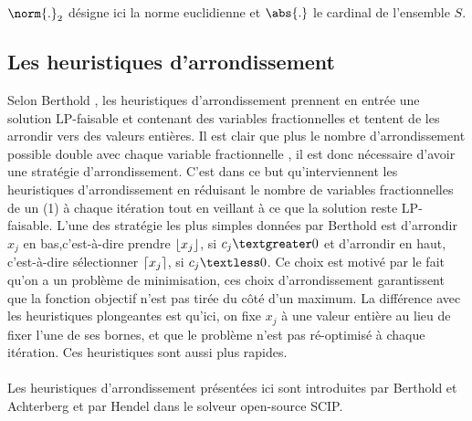 \documentclass[12pt,a4paper,oneside]{book}
\theoremstyle{definition}
\DeclarePairedDelimiter\ceil{\lceil}{\rceil}
\DeclarePairedDelimiter\floor{\lfloor}{\rfloor}
\begin{document}
	$\norm{.}_2$ désigne ici la norme euclidienne et $\abs{.}$ le cardinal de l'ensemble $S$.
	
	
	\paragraph{}
	
	\subsection{Les heuristiques d'arrondissement}
	Selon Berthold \cite{Bertholda}, les heuristiques d'arrondissement prennent en entrée une solution LP-faisable et contenant des variables fractionnelles et tentent de les arrondir vers des valeurs entières. Il est clair que plus le nombre d'arrondissement possible double avec chaque variable fractionnelle \cite{berthold2006}, il est donc nécessaire d'avoir une stratégie d'arrondissement. C'est dans ce but qu'interviennent les heuristiques d'arrondissement en réduisant le nombre de variables fractionnelles de un (1) à chaque itération tout en veillant à ce que la solution reste LP-faisable. L'une des stratégie les plus simples données par Berthold est d'arrondir $x_j$ en bas,c'est-à-dire prendre $\floor{x_j}$, si $c_j \textgreater 0$ et d'arrondir en haut, c'est-à-dire sélectionner $\ceil{x_j}$, si $c_j \textless 0 $. Ce choix est motivé par le fait qu'on a un problème de minimisation, ces choix d'arrondissement garantissent que la fonction objectif n'est pas tirée du côté d'un maximum. 
	La différence avec les heuristiques plongeantes est qu'ici, on fixe $x_j$ à une valeur entière au lieu de fixer l'une de ses bornes, et que le problème n'est pas ré-optimisé à chaque itération. Ces heuristiques sont aussi plus rapides.
	 
	
	\paragraph{}
	Les heuristiques d'arrondissement présentées ici sont introduites par Berthold et Achterberg \cite{berthold2006} et par Hendel \cite{Hendel2011} dans le solveur open-source SCIP.
	
\end{document}
